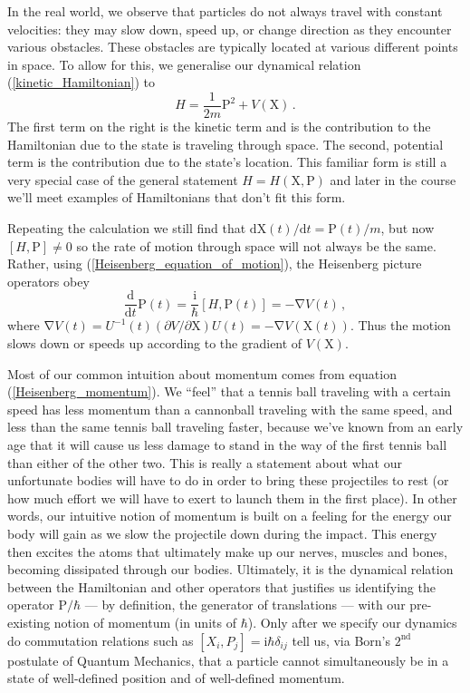 \documentclass{article}
\theoremstyle{plain}\theoremheaderfont{\normalfont\itshape}\theorembodyfont{\rmfamily}\theoremseparator{.}\newtheorem*{rem}{Remark}\newtheorem*{ex}{Example}\newtheorem*{proof}{Proof}\newtheorem*{altp}{Alternative proof}
\theoremstyle{plain}\theoremheaderfont{\normalfont\bfseries}\theorembodyfont{\rmfamily}\theoremseparator{.}\newtheorem{thm}{Theorem}[section]\newtheorem{lem}[thm]{Lemma}\newtheorem{prop}[thm]{Proposition}\newtheorem*{cor}{Corollary}\newtheorem{defn}[thm]{Definition}\newtheorem{clm}[thm]{Claim}\newtheorem{clminproof}{Claim}
\theoremstyle{break}\theoremheaderfont{\normalfont\itshape}\theorembodyfont{\rmfamily}\theoremseparator{.\medskip}\newtheorem*{proofskip}{Proof}\newtheorem*{exs}{Examples}\newtheorem*{rems}{Remarks}
\theoremstyle{break}\theoremheaderfont{\normalfont\bfseries}\theorembodyfont{\rmfamily}\theoremseparator{.\medskip}\newtheorem{lemskip}[thm]{Lemma}\newtheorem{defnskip}[thm]{Definition}\newtheorem{propskip}[thm]{Proposition}\newtheorem{thmskip}[thm]{Theorem}
\numberwithin{equation}{section}
\newcommand{\ii}{\mathrm{i}}
\newcommand{\dv}[3][]{\frac{\mathrm{d}^{#1} #2}{{\mathrm{d} #3}^{#1}}}
\newcommand{\vb}[1]{\bm{\mathrm{#1}}}
\newcommand{\grad}{\vb{\nabla}}
\begin{document}
    In the real world, we observe that particles do not always travel with constant velocities: they may slow down, speed up, or change direction as they encounter various obstacles. These obstacles are typically located at various different points in space. To allow for this, we generalise our dynamical relation (\ref{kinetic_Hamiltonian}) to
    \begin{equation}\label{kinetic_potential_Hamiltonian}
        H=\frac{1}{2m}\vb{P}^2+V(\vb{X})\,.
    \end{equation}
    The first term on the right is the kinetic term and is the contribution to the Hamiltonian due to the state is traveling through space. The second, potential term is the contribution due to the state's location. This familiar form is still a very special case of the general statement \(H=H(\vb{X},\vb{P})\) and later in the course we'll meet examples of Hamiltonians that don't fit this form.

    Repeating the calculation we still find that \(\mathrm{d} \vb{X}(t)/\mathrm{d} t=\vb{P}(t)/m\), but now \([H,\vb{P}]\ne 0\) so the rate of motion through space will not always be the same. Rather, using (\ref{Heisenberg_equation_of_motion}), the Heisenberg picture operators obey
    \begin{equation}\label{Heisenberg_momentum}
        \dv{}{t}\vb{P}(t)=\frac{\ii}{\hbar}[H,\vb{P}(t)]=-\grad V(t)\,,
    \end{equation}
    where \(\grad V(t)=U^{-1}(t)(\partial V/\partial \vb{X})U(t)=-\grad V(\vb{X}(t))\). Thus the motion slows down or speeds up according to the gradient of \(V(\vb{X})\).
    
    Most of our common intuition about momentum comes from equation (\ref{Heisenberg_momentum}). We ``feel'' that a tennis ball traveling with a certain speed has less momentum than a cannonball traveling with the same speed, and less than the same tennis ball traveling faster, because we've known from an early age that it will cause us less damage to stand in the way of the first tennis ball than either of the other two. This is really a statement about what our unfortunate bodies will have to do in order to bring these projectiles to rest (or how much effort we will have to exert to launch them in the first place). In other words, our intuitive notion of momentum is built on a feeling for the energy our body will gain as we slow the projectile down during the impact. This energy then excites the atoms that ultimately make up our nerves, muscles and bones, becoming dissipated through our bodies. Ultimately, it is the dynamical relation between the Hamiltonian and other operators that justifies us identifying the operator \(\vb{P}/\hbar\) --- by definition, the generator of translations --- with our pre-existing notion of momentum (in units of \(\hbar\)). Only after we specify our dynamics do commutation relations such as \([X_i,P_j]=\ii\hbar\delta_{ij}\) tell us, via Born's \(2^\text{nd}\) postulate of Quantum Mechanics, that a particle cannot simultaneously be in a state of well-defined position and of well-defined momentum.
\end{document}
